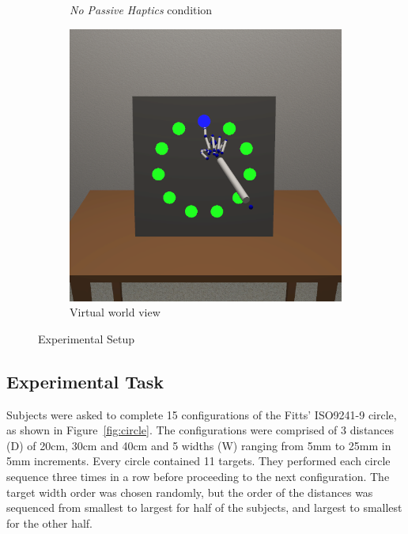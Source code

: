 \documentclass[]{aiaa-tc}%
\begin{document}
\begin{figure}[tb]
\begin{subfigure}{.32\textwidth}
    \caption{\textit{No Passive Haptics} condition}
    \label{fig:no_passive_haptics}
  \end{subfigure}
  \begin{subfigure}{.32\textwidth}
    \centering
    \includegraphics[width=.99\linewidth]{figures/virtual_view.png}
    \caption{Virtual world view}
    \label{fig:virtual_view}
  \end{subfigure}
  \caption{Experimental Setup}
\end{figure}

\subsection{Experimental Task}
Subjects were asked to complete 15 configurations of the Fitts' ISO9241-9 circle, as shown in Figure~\ref{fig:circle}.
The configurations were comprised of 3 distances (D) of 20cm, 30cm and 40cm and 5 widths (W) ranging from 5mm to 25mm in 5mm increments.
Every circle contained 11 targets.
They performed each circle sequence three times in a row before proceeding to the next configuration.
The target width order was chosen randomly, but the order of the distances was sequenced from smallest to largest for half of the subjects, and largest to smallest for the other half.
\end{document}
